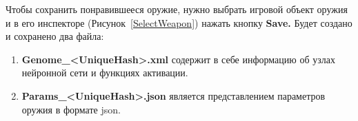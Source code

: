 Чтобы сохранить понравившееся оружие, нужно выбрать игровой объект оружия и в его инспекторе (Рисунок~\ref{SelectWeapon}) нажать кнопку {\small \textbf{Save.}} Будет создано и сохранено два файла:

\begin{enumerate}[label=\textbullet]
    \item {\small \textbf{Genome\_<UniqueHash>.xml}} содержит в себе информацию об узлах нейронной сети и функциях активации.
    \item {\small \textbf{Params\_<UniqueHash>.json}} является представлением параметров оружия в формате json.
\end{enumerate}
